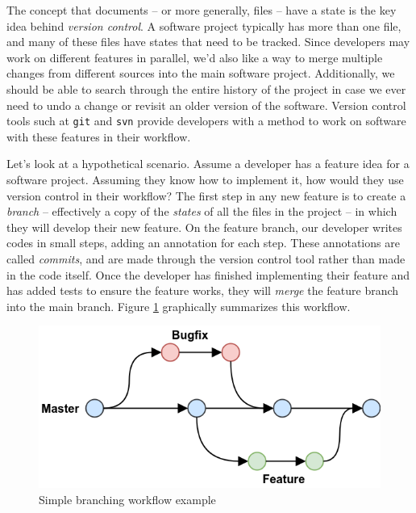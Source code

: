 \documentclass{anstrans}
\begin{document}
    The concept that documents -- or more generally, files -- have a state is the key idea behind {\it version control}. A software project typically has more than one file, and many of these files have states that need to be tracked. Since developers may work on different features in parallel, we'd also like a way to merge multiple changes from different sources into the main software project. Additionally, we should be able to search through the entire history of the project in case we ever
    need to undo a change or revisit an older version of the software. Version control tools such at \verb.git. and \verb.svn. provide developers with a method to work on software with these features in their workflow.
    
    Let's look at a hypothetical scenario. Assume a developer has a feature idea for a software project. Assuming they know how to implement it, how would they use version control in their workflow? The first step in any new feature is to create a {\it branch} -- effectively a copy of the {\it states} of all the files in the project -- in which they will develop their new feature. On the feature branch, our developer writes codes in small steps, adding an annotation for each step. These
    annotations are called {\it commits}, and are made through the version control tool rather than made in the code itself. Once the developer has finished implementing their feature and has added tests to ensure the feature works, they will {\it merge} the feature branch into the main branch. Figure \ref{fig:gh-flow} graphically summarizes this workflow.
    
    \begin{figure}[ht] %
      \centering
      \includegraphics[width=\linewidth]{github-flow.png}
      \caption{Simple branching workflow example \cite{git_flow_fig}}
      \label{fig:gh-flow}
    \end{figure}
\end{document}
